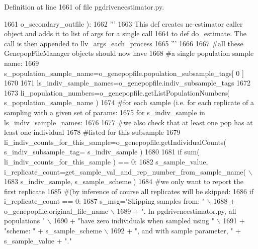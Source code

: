 Definition at line 1661 of file pgdriveneestimator.\+py.


\begin{DoxyCode}
1661                                             o\_secondary\_outfile ):
1662     \textcolor{stringliteral}{'''     }
1663 \textcolor{stringliteral}{    This def creates ne-estimator caller object and adds it to list of args for a single call}
1664 \textcolor{stringliteral}{    to def do\_estimate.  The call is then appended to llv\_args\_each\_process}
1665 \textcolor{stringliteral}{    '''}
1666 
1667     \textcolor{comment}{#all these GenepopFileManager objects should now have}
1668     \textcolor{comment}{#a single population sample name:}
1669     s\_population\_sample\_name=o\_genepopfile.population\_subsample\_tags[ 0 ]
1670 
1671     ls\_indiv\_sample\_names=o\_genepopfile.indiv\_subsample\_tags
1672 
1673     li\_population\_numbers=o\_genepopfile.getListPopulationNumbers( s\_population\_sample\_name )
1674     \textcolor{comment}{#for each sample (i.e. for each replicate of a sampling with a given set of params:}
1675     \textcolor{keywordflow}{for} s\_indiv\_sample \textcolor{keywordflow}{in} ls\_indiv\_sample\_names:
1676 
1677         \textcolor{comment}{#we also check that at least one pop has at least one individual}
1678         \textcolor{comment}{#listed for this subsample}
1679         li\_indiv\_counts\_for\_this\_sample=o\_genepopfile.getIndividualCounts( s\_indiv\_subsample\_tag=
      s\_indiv\_sample )
1680 
1681         \textcolor{keywordflow}{if} sum( li\_indiv\_counts\_for\_this\_sample ) == 0:
1682             s\_sample\_value, i\_replicate\_count=get\_sample\_val\_and\_rep\_number\_from\_sample\_name( \(\backslash\)
1683                                             s\_indiv\_sample, s\_sample\_scheme )
1684             \textcolor{comment}{#we only want to report the first replicate}
1685             \textcolor{comment}{#(by inference of course all replicates will be skipped:}
1686             \textcolor{keywordflow}{if} i\_replicate\_count == 0:
1687                 s\_msg=\textcolor{stringliteral}{"Skipping samples from: "} \(\backslash\)
1688                         + o\_genepopfile.original\_file\_name \(\backslash\)
1689                         + \textcolor{stringliteral}{".  In pgdriveneestimator.py, all populations "} \(\backslash\)
1690                         + \textcolor{stringliteral}{"have zero individuals when sampled using "} \(\backslash\)
1691                         + \textcolor{stringliteral}{"scheme: "} + s\_sample\_scheme \(\backslash\)
1692                         + \textcolor{stringliteral}{", and with sample parameter, "} + s\_sample\_value + \textcolor{stringliteral}{"."}

\end{DoxyCode}
